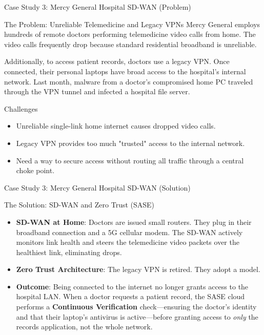 \documentclass[aspectratio=169]{beamer}  %
\begin{document}
\begin{frame}[t]{Case Study 3: Mercy General Hospital SD-WAN (Problem)}
    \begin{casestudy}{The Problem: Unreliable Telemedicine and Legacy VPNs}
        \footnotesize
        Mercy General employs hundreds of remote doctors performing telemedicine video calls from home. The video calls frequently drop because standard residential broadband is unreliable. 
        
        Additionally, to access patient records, doctors use a legacy VPN. Once connected, their personal laptops have broad access to the hospital's internal network. Last month, malware from a doctor's compromised home PC traveled through the VPN tunnel and infected a hospital file server.
    \end{casestudy}
    
    \begin{alertblock}{Challenges}
        \begin{itemize}
            \footnotesize
            \item Unreliable single-link home internet causes dropped video calls.
            \item Legacy VPN provides too much "trusted" access to the internal network.
            \item Need a way to secure access without routing all traffic through a central choke point.
        \end{itemize}
    \end{alertblock}
\end{frame}

\begin{frame}[t]{Case Study 3: Mercy General Hospital SD-WAN (Solution)}
    \begin{casesolution}{The Solution: SD-WAN and Zero Trust (SASE)}
        \footnotesize
        \begin{itemize}
            \item \textbf{SD-WAN at Home}: Doctors are issued small  routers. They plug in their broadband connection and a 5G cellular modem. The SD-WAN actively monitors link health and steers the telemedicine video packets over the healthiest link, eliminating drops.
            \item \textbf{Zero Trust Architecture}: The legacy VPN is retired. They adopt a  model. 
            \item \textbf{Outcome}: Being connected to the internet no longer grants access to the hospital LAN. When a doctor requests a patient record, the SASE cloud performs a \textbf{Continuous Verification} check—ensuring the doctor's identity and that their laptop's antivirus is active—before granting access to \textit{only} the records application, not the whole network.
        \end{itemize}
    \end{casesolution}
\end{frame}
\end{document}
